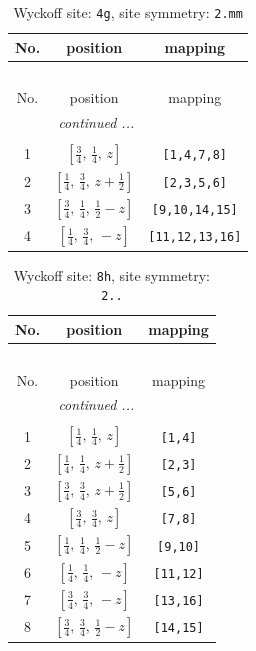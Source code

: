 \documentclass[fleqn,8pt]{jsarticle}
\begin{document}
\renewcommand{\arraystretch}{1.2}
\begin{longtable}{ccc}
\caption{Wyckoff site: {\tt 4g}, site symmetry: {\tt 2.mm}}
 \\
 \hline \hline
No. & position & mapping \\ \hline \endfirsthead

\multicolumn{2}{l}{\tablename\ \thetable{}} \\
 \hline \hline
No. & position & mapping \\ \hline \endhead

 \hline \hline
\multicolumn{2}{r}{\footnotesize\it continued ...} \\ \endfoot

 \hline \hline
\multicolumn{2}{r}{} \\ \endlastfoot

1 & $\left[ \frac{3}{4},\, \frac{1}{4},\, z \right]$ & {\tt [1,4,7,8]} \\ \hline
2 & $\left[ \frac{1}{4},\, \frac{3}{4},\, z + \frac{1}{2} \right]$ & {\tt [2,3,5,6]} \\ \hline
3 & $\left[ \frac{3}{4},\, \frac{1}{4},\, \frac{1}{2} - z \right]$ & {\tt [9,10,14,15]} \\ \hline
4 & $\left[ \frac{1}{4},\, \frac{3}{4},\, - z \right]$ & {\tt [11,12,13,16]} \\
\end{longtable}
\renewcommand{\arraystretch}{1.2}
\begin{longtable}{ccc}
\caption{Wyckoff site: {\tt 8h}, site symmetry: {\tt 2..}}
 \\
 \hline \hline
No. & position & mapping \\ \hline \endfirsthead

\multicolumn{2}{l}{\tablename\ \thetable{}} \\
 \hline \hline
No. & position & mapping \\ \hline \endhead

 \hline \hline
\multicolumn{2}{r}{\footnotesize\it continued ...} \\ \endfoot

 \hline \hline
\multicolumn{2}{r}{} \\ \endlastfoot

1 & $\left[ \frac{1}{4},\, \frac{1}{4},\, z \right]$ & {\tt [1,4]} \\ \hline
2 & $\left[ \frac{1}{4},\, \frac{1}{4},\, z + \frac{1}{2} \right]$ & {\tt [2,3]} \\ \hline
3 & $\left[ \frac{3}{4},\, \frac{3}{4},\, z + \frac{1}{2} \right]$ & {\tt [5,6]} \\ \hline
4 & $\left[ \frac{3}{4},\, \frac{3}{4},\, z \right]$ & {\tt [7,8]} \\ \hline
5 & $\left[ \frac{1}{4},\, \frac{1}{4},\, \frac{1}{2} - z \right]$ & {\tt [9,10]} \\ \hline
6 & $\left[ \frac{1}{4},\, \frac{1}{4},\, - z \right]$ & {\tt [11,12]} \\ \hline
7 & $\left[ \frac{3}{4},\, \frac{3}{4},\, - z \right]$ & {\tt [13,16]} \\ \hline
8 & $\left[ \frac{3}{4},\, \frac{3}{4},\, \frac{1}{2} - z \right]$ & {\tt [14,15]} \\
\end{longtable}
\end{document}
